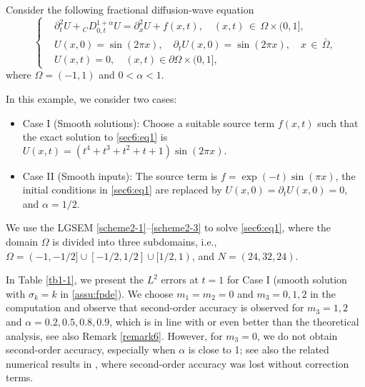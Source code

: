 \documentclass[10pt]{siamltex}
\newcommand{\px}[1][x]{\partial_{#1}}
\begin{document}
\begin{example}\label{s6eg1}
Consider the following fractional diffusion-wave equation
\begin{equation}\label{sec6:eq1}
\left\{\begin{aligned}
&\px[t]^2U+{}_{C}D^{1+\alpha}_{0,t}U=\px^2U+f(x,t),{\quad}(x,t){\,\in\,}\Omega{\times}(0,1],\\
&U(x,0)=\sin(2\pi x),\quad\px[t]U(x,0)=\sin(2\pi x),{\quad}x{\,\in\,}\bar{\Omega},\\
&U(x,t)=0,{\quad}(x,t)\in\partial\Omega\times(0,1],
\end{aligned}\right.
\end{equation}
where $\Omega=(-1,1)$ and $0<\alpha<1$.
\end{example}
In this example, we consider two cases:
\begin{itemize}
  \item Case I (Smooth solutions): Choose a suitable source term $f(x,t)$
  such that  the exact solution  to  \eqref{sec6:eq1} is
$U(x,t)=(t^4+t^3+t^{2}+t+1)\sin(2\pi x).$
  \item Case II (Smooth inputs): The source term is $f=\exp(-t)\sin(\pi x)$,
  the initial conditions in
  \eqref{sec6:eq1} are  replaced by $U(x,0)=\px[t]U(x,0)=0$, and $\alpha=1/2$.
\end{itemize}

We use the LGSEM \eqref{scheme2-1}--\eqref{scheme2-3}  to solve \eqref{sec6:eq1}, where
the domain $\Omega$   is divided into three subdomains, i.e., $\Omega=(-1,-1/2]\cup[-1/2,1/2]\cup[1/2,1)$,
and $N=(24,32,24)$.

In Table \ref{tb1-1}, we present the  $L^2$ errors at $t=1$ for Case I (smooth solution
with $\sigma_k=k$ in \eqref{assu:fpde}). We choose $m_1=m_2=0$ and $m_3=0,1,2$
in the computation and observe that   second-order accuracy
is observed for $m_3=1,2$ and $\alpha=0.2,0.5,0.8,0.9$,
which is in line with or even better than the theoretical analysis,
see also Remark \ref{remark6}.
\textcolor[rgb]{0.00,0.00,0.00}{However,} for $m_3=0$,   we do not obtain
second-order accuracy, especially when $\alpha$ is close to 1; see  also the related
numerical results in \cite{WangVong14b,Zeng14},  {where second-order accuracy
was lost without correction terms}.
\end{document}
